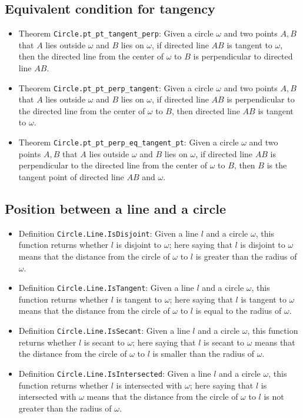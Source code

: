 \documentclass[12pt]{amsart}
\begin{document}
\subsection{Equivalent condition for tangency}
\begin{itemize}
    \item Theorem \verb|Circle.pt_pt_tangent_perp|: Given a circle $\omega$ and two points $A,B$ that $A$ lies outside $\omega$ and $B$ lies on $\omega$, if directed line $AB$ is tangent to $\omega$, then the directed line from the center of $\omega$ to $B$ is perpendicular to directed line $AB$.
    \item Theorem \verb|Circle.pt_pt_perp_tangent|: Given a circle $\omega$ and two points $A,B$ that $A$ lies outside $\omega$ and $B$ lies on $\omega$, if directed line $AB$ is perpendicular to the directed line from the center of $\omega$ to $B$, then directed line $AB$ is tangent to $\omega$.
    \item Theorem \verb|Circle.pt_pt_perp_eq_tangent_pt|: Given a circle $\omega$ and two points $A,B$ that $A$ lies outside $\omega$ and $B$ lies on $\omega$, if directed line $AB$ is perpendicular to the directed line from the center of $\omega$ to $B$, then $B$ is the tangent point of directed line $AB$ and $\omega$.
\end{itemize}

\subsection{Position between a line and a circle}
\begin{itemize}
    \item Definition \verb|Circle.Line.IsDisjoint|: Given a line $l$ and a circle $\omega$, this function returns whether $l$ is disjoint to $\omega$; here saying that $l$ is disjoint to $\omega$ means that the distance from the circle of $\omega$ to $l$ is greater than the radius of $\omega$.
    \item Definition \verb|Circle.Line.IsTangent|: Given a line $l$ and a circle $\omega$, this function returns whether $l$ is tangent to $\omega$; here saying that $l$ is tangent to $\omega$ means that the distance from the circle of $\omega$ to $l$ is equal to the radius of $\omega$.
    \item Definition \verb|Circle.Line.IsSecant|: Given a line $l$ and a circle $\omega$, this function returns whether $l$ is secant to $\omega$; here saying that $l$ is secant to $\omega$ means that the distance from the circle of $\omega$ to $l$ is smaller than the radius of $\omega$.
    \item Definition \verb|Circle.Line.IsIntersected|: Given a line $l$ and a circle $\omega$, this function returns whether $l$ is intersected with $\omega$; here saying that $l$ is intersected with $\omega$ means that the distance from the circle of $\omega$ to $l$ is not greater than the radius of $\omega$.
\end{itemize}
\end{document}
